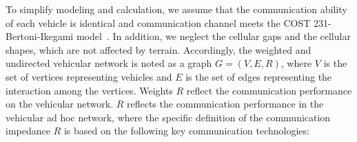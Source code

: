 \documentclass[journal,12pt,draftclsnofoot,onecolumn]{IEEEtran}
\begin{document}
To simplify modeling and calculation, we assume that the communication ability of each vehicle is identical and communication channel meets the COST 231-Bertoni-Ikegami model~\cite{correia2009view}. In addition, we neglect the cellular gaps and the cellular shapes, which are not affected by terrain. Accordingly, the weighted and undirected vehicular network is noted as a graph $G\!=\!(V,E,R)$, where $V$ is the set of vertices representing vehicles and $E$ is the set of edges representing the interaction among the vertices. Weights $R$ reflect the communication performance on the vehicular network. $R$ reflects the communication performance in the vehicular ad hoc network, where the specific definition of the communication impedance $R$ is based on the following key communication technologies:
\end{document}
